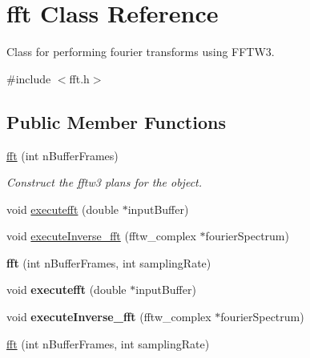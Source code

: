 \hypertarget{classfft}{\section{fft Class Reference}
\label{classfft}
}


Class for performing fourier transforms using F\-F\-T\-W3.  




{\ttfamily \#include $<$fft.\-h$>$}

\subsection*{Public Member Functions}
\begin{DoxyCompactItemize}
\item 
\hypertarget{classfft_a5fff94ac07119207ddd05f628be5891d}{\hyperlink{classfft_a5fff94ac07119207ddd05f628be5891d}{fft} (int n\-Buffer\-Frames)}\label{classfft_a5fff94ac07119207ddd05f628be5891d}

\begin{DoxyCompactList}\small\item\em Construct the fftw3 plans for the object. \end{DoxyCompactList}\item 
void \hyperlink{classfft_a47e58fd4f715ad89a6fad8df9d715bf4}{executefft} (double $\ast$input\-Buffer)
\item 
void \hyperlink{classfft_a228bd861564c189cd7b6800c950a1c09}{execute\-Inverse\-\_\-fft} (fftw\-\_\-complex $\ast$fourier\-Spectrum)
\item 
\hypertarget{classfft_a57f8fc9224851c0a827b3d46102f1623}{{\bfseries fft} (int n\-Buffer\-Frames, int sampling\-Rate)}\label{classfft_a57f8fc9224851c0a827b3d46102f1623}

\item 
\hypertarget{classfft_a47e58fd4f715ad89a6fad8df9d715bf4}{void {\bfseries executefft} (double $\ast$input\-Buffer)}\label{classfft_a47e58fd4f715ad89a6fad8df9d715bf4}

\item 
\hypertarget{classfft_a228bd861564c189cd7b6800c950a1c09}{void {\bfseries execute\-Inverse\-\_\-fft} (fftw\-\_\-complex $\ast$fourier\-Spectrum)}\label{classfft_a228bd861564c189cd7b6800c950a1c09}

\item 
\hypertarget{classfft_a57f8fc9224851c0a827b3d46102f1623}{\hyperlink{classfft_a57f8fc9224851c0a827b3d46102f1623}{fft} (int n\-Buffer\-Frames, int sampling\-Rate)}\label{classfft_a57f8fc9224851c0a827b3d46102f1623}


\end{DoxyCompactItemize}
